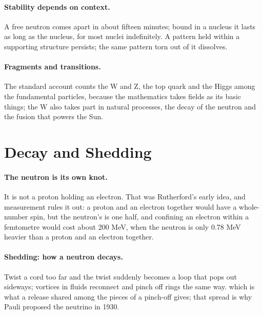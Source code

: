 \documentclass[11pt,a4paper]{article}
\begin{document}
\paragraph{Stability depends on context.} A free neutron comes apart in about fifteen minutes; bound in a nucleus it lasts as long as the nucleus, for most nuclei indefinitely. A pattern held within a supporting structure persists; the same pattern torn out of it dissolves.

\paragraph{Fragments and transitions.} The standard account counts the W and Z, the top quark and the Higgs among the fundamental particles, because the mathematics takes fields as its basic things; the W also takes part in natural processes, the decay of the neutron and the fusion that powers the Sun.  

\section{Decay and Shedding}
\label{sec:decay}

\paragraph{The neutron is its own knot.} It is not a proton holding an electron. That was Rutherford's early idea, and measurement rules it out: a proton and an electron together would have a whole-number spin, but the neutron's is one half, and confining an electron within a femtometre would cost about 200 MeV, when the neutron is only 0.78 MeV heavier than a proton and an electron together.

\paragraph{Shedding: how a neutron decays.}  Twist a cord too far and the twist suddenly becomes a loop that pops out sideways; vortices in fluids reconnect and pinch off rings the same way.  which is what a release shared among the pieces of a pinch-off gives; that spread is why Pauli proposed the neutrino in 1930.
\end{document}

